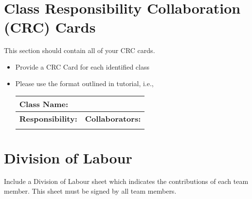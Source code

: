\documentclass[]{article}
\begin{document}

	
\section{Class Responsibility Collaboration (CRC) Cards}
\label{sec:class_responsibility_collaboration_crc_cards}
This section should contain all of your CRC cards.

\begin{itemize}
	\item Provide a CRC Card for each identified class
	\item Please use the format outlined in tutorial, i.e., 
	\begin{table}[ht]
		\centering
		\begin{tabular}{|p{5cm}|p{5cm}|}
		\hline 
		 \multicolumn{2}{|l|}{\textbf{Class Name:}} \\
		\hline
		\textbf{Responsibility:} & \textbf{Collaborators:} \\
		\hline
		\vspace{1in} & \\
		\hline
		\end{tabular}
	\end{table}
	
\end{itemize}

\appendix
\section{Division of Labour}
\label{sec:division_of_labour}
Include a Division of Labour sheet which indicates the contributions of each team member. This sheet must be signed by all team members.
\end{document}
